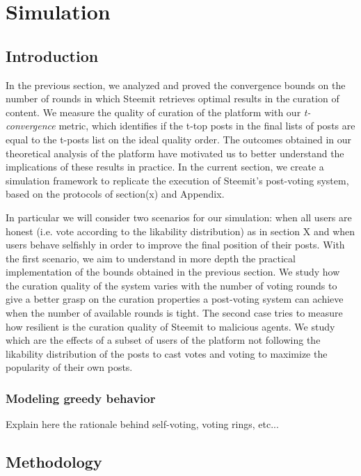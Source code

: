 
\section{Simulation}

\subsection{Introduction}

In the previous section, we analyzed and proved the convergence bounds on the number of rounds in which Steemit retrieves optimal results in the curation of content.
We measure the quality of curation of the platform with our \textit{t-convergence} metric, which identifies if the t-top posts in the final lists of posts are equal to the t-posts list on the ideal quality order.
The outcomes obtained in our theoretical analysis of the platform have motivated us to better understand the implications of these results in practice. In the current section, we create a simulation framework to replicate the execution of Steemit's post-voting system, based on the protocols of section(x) and Appendix.

In particular we will consider two scenarios for our simulation: when all users are honest (i.e. vote according to the likability distribution) as in section X and when users behave selfishly in order to improve the final position of their posts.
With the first scenario, we aim to understand in more depth the practical implementation of the bounds obtained in the previous section. We study how the curation quality of the system varies with the number of voting rounds to give a better grasp on the curation properties a post-voting system can achieve when the number of available rounds is tight.
The second case tries to measure how resilient is the curation quality of Steemit to malicious agents. We study which are the effects of a subset of users of the platform not following the likability distribution of the posts to cast votes and voting to maximize the popularity of their own posts.

\subsubsection*{Modeling greedy behavior}

Explain here the rationale behind self-voting, voting rings, etc...



\subsection{Methodology}

